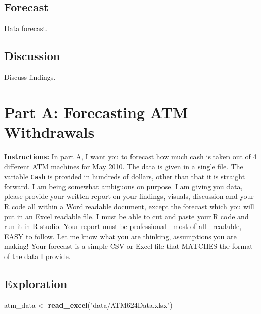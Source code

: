 \documentclass[openany]{book}
\newenvironment{Shaded}{\begin{snugshade}}{\end{snugshade}}
\newcommand{\KeywordTok}[1]{\textcolor[rgb]{0.13,0.29,0.53}{\textbf{#1}}}
\newcommand{\NormalTok}[1]{#1}
\newcommand{\StringTok}[1]{\textcolor[rgb]{0.31,0.60,0.02}{#1}}
\renewenvironment{quote}{\begin{myquote}}{\end{myquote}}
\begin{document}
\hypertarget{a-forecast}{%
\section*{Forecast}\label{a-forecast}}

Data forecast.

\hypertarget{a-discussion}{%
\section*{Discussion}\label{a-discussion}}

Discuss findings.

\hypertarget{part-a}{%
\chapter*{Part A: Forecasting ATM Withdrawals}\label{part-a}}

\begin{quote}
\textbf{Instructions:} In part A, I want you to forecast how much cash is taken out of 4 different ATM machines for May 2010. The data is given in a single file. The variable \texttt{Cash} is provided in hundreds of dollars, other than that it is straight forward. I am being somewhat ambiguous on purpose. I am giving you data, please provide your written report on your findings, visuals, discussion and your R code all within a Word readable document, except the forecast which you will put in an Excel readable file. I must be able to cut and paste your R code and run it in R studio. Your report must be professional - most of all - readable, EASY to follow. Let me know what you are thinking, assumptions you are making! Your forecast is a simple CSV or Excel file that MATCHES the format of the data I provide.
\end{quote}

\hypertarget{a-exploration}{%
\section*{Exploration}\label{a-exploration}}

\begin{Shaded}
\begin{Highlighting}[]
\NormalTok{atm_data <-}\StringTok{ }\KeywordTok{read_excel}\NormalTok{(}\StringTok{"data/ATM624Data.xlsx"}\NormalTok{) }
\end{Highlighting}
\end{Shaded}
\end{document}
